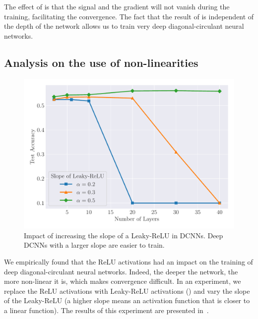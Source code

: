 The effect of  is that the signal and the gradient will not vanish during the training, facilitating the convergence.
The fact that the result of  is independent of the depth of the network allows us to train very deep diagonal-circulant neural networks.



\subsection{Analysis on the use of non-linearities}
\label{subsection:ch4-analysis_on_the_use_of_non-linearities}

\begin{figure}[htb]
  \centering
  \includegraphics[width=\scalefigure\textwidth]{figures/main/ch4-diagonal_circulant/cifar10_leaky_relu.pdf}
  \caption{
    Impact of increasing the slope of a Leaky-ReLU in DCNNs.
    Deep DCNNs with a larger slope are easier to train.}
  \label{figure:ch4-cifar10_leaky_relu}
\end{figure}


We empirically found that the ReLU activations had an impact on the training of deep diagonal-circulant neural networks.
Indeed, the deeper the network, the more non-linear it is, which makes convergence difficult.
In an experiment, we replace the ReLU activations with Leaky-ReLU activations (\cf {}) and vary the slope of the Leaky-ReLU (a higher slope means an activation function that is closer to a linear function).
The results of this experiment are presented in~.


